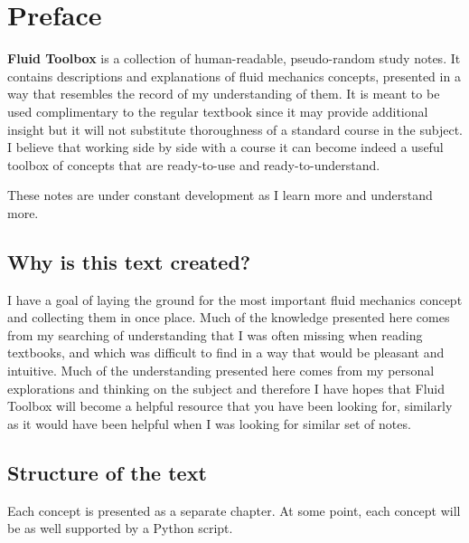 \documentclass[10pt]{report}
\begin{document}
\setlength{\parskip}{0.6em}
\setlength{\parindent}{0cm}

\tableofcontents

\chapter*{Preface}



\textbf{Fluid Toolbox } is a collection of human-readable, pseudo-random study notes. It contains descriptions and explanations of fluid mechanics concepts, presented in a way that resembles the record of my understanding of them. It is meant to be used complimentary to the regular textbook since it may provide additional insight but it will not substitute thoroughness of a standard course in the subject. I believe that working side by side with a course it can become indeed a useful toolbox of concepts that are ready-to-use and ready-to-understand.

These notes are under constant development as I learn more and understand more.

\section*{Why is this text created?}

I have a goal of laying the ground for the most important fluid mechanics concept and collecting them in once place. Much of the knowledge presented here comes from my searching of understanding that I was often missing when reading textbooks, and which was difficult to find in a way that would be pleasant and intuitive. Much of the understanding presented here comes from my personal explorations and thinking on the subject and therefore I have hopes that Fluid Toolbox will become a helpful resource that you have been looking for, similarly as it would have been helpful when I was looking for similar set of notes.

\section*{Structure of the text}

Each concept is presented as a separate chapter. At some point, each concept will be as well supported by a Python script.
\end{document}
